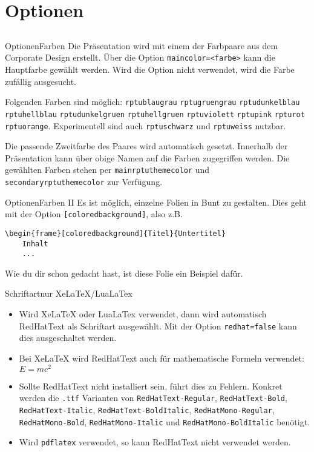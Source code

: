 \documentclass[german,10pt,xcolor=colortbl,compress
]{beamer}
\begin{document}
\section{Optionen}
\subsection*{}
\newcommand{\farbe}[1]{{\color{#1}\lstinline|#1|}}
\begin{frame}{Optionen}{Farben}
	Die Präsentation wird mit einem der Farbpaare aus dem Corporate Design erstellt. Über die Option \lstinline!maincolor=<farbe>! kann die Hauptfarbe gewählt werden. Wird die Option nicht verwendet, wird die Farbe zufällig ausgesucht. \par
	Folgenden Farben sind möglich:
	\farbe{rptublaugrau} \farbe{rptugruengrau} \farbe{rptudunkelblau} \farbe{rptuhellblau}
	\farbe{rptudunkelgruen} \farbe{rptuhellgruen} \farbe{rptuviolett} \farbe{rptupink}
	\farbe{rpturot} \farbe{rptuorange}. Experimentell sind auch \farbe{rptuschwarz} und \color{black}\lstinline!rptuweiss! nutzbar.\par
	Die passende Zweitfarbe des Paares wird automatisch gesetzt. Innerhalb der Präsentation kann über obige Namen auf die Farben zugegriffen werden. Die gewählten Farben stehen per \farbe{mainrptuthemecolor} und \farbe{secondaryrptuthemecolor} zur Verfügung. \par
\end{frame}
\begin{frame}{Optionen}{Farben II}
	Es ist möglich, einzelne Folien in Bunt zu gestalten. Dies geht mit der Option \lstinline![coloredbackground]!, also z.B.
	\begin{lstlisting}
\begin{frame}[coloredbackground]{Titel}{Untertitel}
	Inhalt
	...
\end{lstlisting}
	Wie du dir schon gedacht hast, ist diese Folie ein Beispiel dafür.
\end{frame}
\begin{frame}{Schriftart}{nur XeLaTeX/LuaLaTex}
	\begin{itemize}
		\item Wird XeLaTeX oder LuaLaTex verwendet, dann wird automatisch RedHatText als Schriftart ausgewählt. Mit der Option \lstinline!redhat=false! kann dies ausgeschaltet werden. 
		\item Bei XeLaTeX wird RedHatText auch für mathematische Formeln verwendet: $E=mc^2$
		\item Sollte RedHatText nicht installiert sein, führt dies zu Fehlern. Konkret werden die \lstinline!.ttf! Varianten von \lstinline!RedHatText-Regular!, \lstinline!RedHatText-Bold!, \lstinline!RedHatText-Italic!, \lstinline!RedHatText-BoldItalic!, \lstinline!RedHatMono-Regular!, \lstinline!RedHatMono-Bold!, \lstinline!RedHatMono-Italic! und \lstinline!RedHatMono-BoldItalic! benötigt. 
		\item Wird \lstinline!pdflatex! verwendet, so kann RedHatText nicht verwendet werden.
	\end{itemize}
\end{frame}
\end{document}
